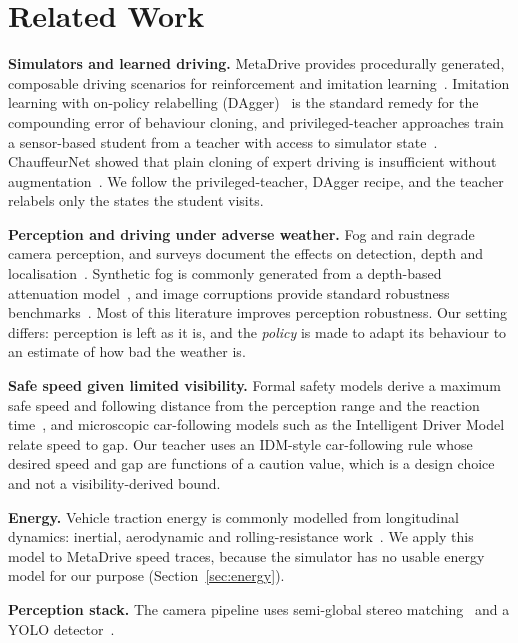 \documentclass[conference]{IEEEtran}
\begin{document}
\section{Related Work}
\textbf{Simulators and learned driving.} MetaDrive provides procedurally generated, composable driving scenarios for reinforcement and imitation learning~\cite{li2022metadrive}. Imitation learning with on-policy relabelling (DAgger)~\cite{ross2011dagger} is the standard remedy for the compounding error of behaviour cloning, and privileged-teacher approaches train a sensor-based student from a teacher with access to simulator state~\cite{chen2019cheating,zhang2021roach}. ChauffeurNet showed that plain cloning of expert driving is insufficient without augmentation~\cite{bansal2019chauffeurnet}. We follow the privileged-teacher, DAgger recipe, and the teacher relabels only the states the student visits.

\textbf{Perception and driving under adverse weather.} Fog and rain degrade camera perception, and surveys document the effects on detection, depth and localisation~\cite{zhang2023adverse}. Synthetic fog is commonly generated from a depth-based attenuation model~\cite{sakaridis2018foggy}, and image corruptions provide standard robustness benchmarks~\cite{hendrycks2019corruptions}. Most of this literature improves perception robustness. Our setting differs: perception is left as it is, and the \emph{policy} is made to adapt its behaviour to an estimate of how bad the weather is.

\textbf{Safe speed given limited visibility.} Formal safety models derive a maximum safe speed and following distance from the perception range and the reaction time~\cite{shalev2017rss}, and microscopic car-following models such as the Intelligent Driver Model~\cite{treiber2000idm} relate speed to gap. Our teacher uses an IDM-style car-following rule whose desired speed and gap are functions of a caution value, which is a design choice and not a visibility-derived bound.

\textbf{Energy.} Vehicle traction energy is commonly modelled from longitudinal dynamics: inertial, aerodynamic and rolling-resistance work~\cite{guzzella2013propulsion}. We apply this model to MetaDrive speed traces, because the simulator has no usable energy model for our purpose (Section~\ref{sec:energy}).

\textbf{Perception stack.} The camera pipeline uses semi-global stereo matching~\cite{hirschmuller2008sgm} and a YOLO detector~\cite{redmon2016yolo,jocher2023yolov8}.
\end{document}
